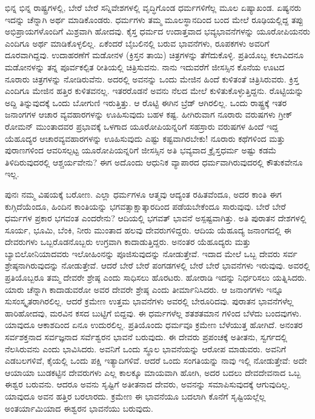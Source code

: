 ಭಿನ್ನ ಭಿನ್ನ ರಾಷ್ಟ್ರಗಳಲ್ಲಿ, ಬೇರೆ ಬೇರೆ ಸನ್ನಿವೇಶಗಳಲ್ಲಿ ವೃದ್ಧಿಗೊಂಡ ಧರ್ಮಗಳಿಗೆಲ್ಲ ಮೂಲ ಏಷ್ಯಾಖಂಡ. ಏಷ್ಯನರು ಇದನ್ನು ಚೆನ್ನಾಗಿ ಅರ್ಥ ಮಾಡಿಕೊಂಡರು. ಧರ್ಮಗಳು ತಮ್ಮ ಮೂಲಸ್ಥಾನದಿಂದ ಬಂದ ಮೇಲೆ ರೂಢಿಯಲ್ಲಿದ್ದ ತಪ್ಪು ಅಭಿಪ್ರಾಯಗಳೊಂದಿಗೆ ಮಿಶ್ರವಾಗಿ ಹೋದವು. ಕೈಸ್ತ ಧರ್ಮದ ಉದಾತ್ತವಾದ ಭವ್ಯಭಾವನೆಗಳನ್ನು ಯೂರೋಪಿಯನರು ಎಂದಿಗೂ ಅರ್ಥ ಮಾಡಿಕೊಳ್ಳಲಿಲ್ಲ. ಏಕೆಂದರೆ ಬೈಬಲಿನಲ್ಲಿ ಬರುವ ಭಾವನೆಗಳು, ರೂಪಕಗಳು ಅವರಿಗೆ ದೂರವಾಗಿದ್ದವು. ಉದಾಹರಣೆಗೆ ಮಡೋನಳ (ಕ್ರಿಸ್ತನ ತಾಯಿ) ಚಿತ್ರಗಳನ್ನು ತೆಗೆದುಕೊಳ್ಳಿ. ಪ್ರತಿಯೊಬ್ಬ ಕಲಾವಿದನೂ ಮಡೋನಳನ್ನು ತನ್ನ ಪೂರ್ವಕಲ್ಪಿತ ರೀತಿಯಲ್ಲಿ ಚಿತ್ರಿಸುವನು. ನಾನು ಇದುವರೆಗೆ ಜೀಸಸ್ಸಿನ ಕೊನೆಯ ಊಟದ ನೂರಾರು ಚಿತ್ರಗಳನ್ನು ನೋಡಿರುವೆನು. ಅದರಲ್ಲಿ ಅವನನ್ನು ಒಂದು ಮೇಜಿನ ಹಿಂದೆ ಕುಳಿತಂತೆ ಚಿತ್ರಿಸಿರುವರು. ಕ್ರಿಸ್ತ ಎಂದಿಗೂ ಮೇಜಿನ ಹತ್ತಿರ ಕುಳಿತವನಲ್ಲ. ಇತರರೊಡನೆ ಅವನು ನೆಲದ ಮೇಲೆ ಕುಳಿತುಕೊಳ್ಳುತ್ತಿದ್ದನು. ರೊಟ್ಟಿಯನ್ನು ಅದ್ದಿ ತಿನ್ನುವುದಕ್ಕೆ ಒಂದು ಬೋಗುಣಿ ಇರುತ್ತಿತ್ತು. ಆ ರೊಟ್ಟಿ ಈಗಿನ ಬ್ರೆಡ್ ಆಗಿರಲಿಲ್ಲ. ಒಂದು ರಾಷ್ಟ್ರಕ್ಕೆ ಇತರ ಜನಾಂಗಗಳ ಆಚಾರ ವ್ಯವಹಾರಗಳನ್ನು ಊಹಿಸುವುದು ಬಹಳ ಕಷ್ಟ. ಹೀಗಿರುವಾಗ ನೂರಾರು ವರುಷಗಳು ಗ್ರೀಕ್ ರೋಮನ್ ಮುಂತಾದವರ ಪ್ರಭಾವಕ್ಕೆ ಒಳಗಾದ ಯೂರೋಪಿಯನ್ನರಿಗೆ ಸಹಸ್ರಾರು ವರುಷಗಳ ಹಿಂದೆ ಇದ್ದ ಯೆಹೂದ್ಯರ ಆಚಾರವ್ಯವಹಾರಗಳನ್ನು ಊಹಿಸುವುದು ಎಷ್ಟು ಕಷ್ಟವಾಗಿರಬೇಕು! ನೂರಾರು ಕಥೆಗಳಿಂದ ಮತ್ತು ಪುರಾಣಗಳಿಂದ ಆವರಿಸಲ್ಪಟ್ಟ ಯೂರೋಪಿಯನ್ನರಿಗೆ ಜೀಸಸ್ಸಿನ ಅತಿ ಭವ್ಯವಾದ ಕ್ರೈಸ್ತಧರ್ಮ ಅಷ್ಟು ಕಡಮೆ ತಿಳಿದಿರುವುದರಲ್ಲಿ ಆಶ್ಚರ್ಯವೇನು? ಈಗ ಅದೊಂದು ಆಧುನಿಕ ವ್ಯಾಪಾರದ ಧರ್ಮವಾಗಿರುವುದರಲ್ಲಿ ಕೌತುಕವೇನೂ ಇಲ್ಲ.

ಪುನಃ ನಮ್ಮ ವಿಷಯಕ್ಕೆ ಬರೋಣ. ಎಲ್ಲಾ ಧರ್ಮಗಳೂ ಆತ್ಮವು ಆದ್ಯಂತ ರಹಿತವೆಂದೂ, ಅದರ ಕಾಂತಿ ಈಗ ಕುಗ್ಗಿದೆಯೆಂದೂ, ಹಿಂದಿನ ಕಾಂತಿಯನ್ನು ಭಗವತ್ಸಾಕ್ಷಾತ್ಕಾರದಿಂದ ಪಡೆಯಬೇಕೆಂದೂ ಸಾರುವುವು. ಬೇರೆ ಬೇರೆ ಧರ್ಮಗಳ ಪ್ರಕಾರ ಭಗವಂತ ಎಂದರೇನು? ಆದಿಯಲ್ಲಿ ಭಗವತ್ ಭಾವನೆ ಅಸ್ಪಷ್ಟವಾಗಿತ್ತು. ಅತಿ ಪುರಾತನ ದೇಶಗಳಲ್ಲಿ ಸೂರ್ಯ, ಭೂಮಿ, ಬೆಂಕಿ, ನೀರು ಮುಂತಾದ ಹಲವು ದೇವರುಗಳಿದ್ದರು. ಆದಿಯ ಯೆಹೂದ್ಯ ಜನಾಂಗದಲ್ಲಿ ಈ ದೇವರುಗಳು ಒಬ್ಬರೊಡನೊಬ್ಬರು ಉಗ್ರವಾಗಿ ಕಾದಾಡುತ್ತಿದ್ದರು. ಅನಂತರ ಯೆಹೂದ್ಯರು ಮತ್ತು ಬ್ಯಾಬಿಲೋನಿಯಾದವರು ಇಲೋಹಿಂನನ್ನು ಪೂಜಿಸುವುದನ್ನು ನೋಡುತ್ತೇವೆ. ಇದಾದ ಮೇಲೆ ಒಬ್ಬ ದೇವರು ಸರ್ವ ಶ್ರೇಷ್ಠನಾಗಿರುವುದನ್ನು ನೋಡುತ್ತೇವೆ. ಆದರೆ ಬೇರೆ ಬೇರೆ ಪಂಗಡಗಳಲ್ಲಿ ಬೇರೆ ಬೇರೆ ಭಾವನೆಗಳು ಇರುವುವು. ಅವರಲ್ಲಿ ಪ್ರತಿಯೊಬ್ಬರೂ ತಮ್ಮ ದೇವರೇ ಶ್ರೇಷ್ಠ ಎಂದು ಸಾಧಿಸಲು ಹೊರಟರು. ಹೋರಾಡಿ ಇದನ್ನು ನಿರ್ಧರಿಸಲು ಯತ್ನಿಸಿದರು. ಯಾರು ಚೆನ್ನಾಗಿ ಕಾದಾಡುವರೋ ಅವರ ದೇವರೇ ಶ್ರೇಷ್ಠ ಎಂದು ತೀರ್ಮಾನಿಸಿದರು. ಆ ಜನಾಂಗಗಳು ಇನ್ನೂ ಸುಸಂಸ್ಕೃತರಾಗಿರಲಿಲ್ಲ. ಆದರೆ ಕ್ರಮೇಣ ಉತ್ತಮ ಭಾವನೆಗಳು ಅವರಲ್ಲಿ ಬೇರೂರಿದವು. ಪುರಾತನ ಭಾವನೆಗಳೆಲ್ಲ ಹಾರಿಹೋದವು, ಮರವಿನ ಕಸದ ಬುಟ್ಟಿಗೆ ಬಿದ್ದವು. ಈ ಧರ್ಮಗಳೆಲ್ಲ ಶತಶತಮಾನ ಗಳಿಂದ ಬೆಳೆದು ಬಂದವುಗಳು. ಯಾವುದೂ ಆಕಾಶದಿಂದ ಏನೂ ಉದುರಲಿಲ್ಲ. ಪ್ರತಿಯೊಂದು ಧರ್ಮವೂ ಕ್ರಮೇಣ ಬೆಳೆಯುತ್ತ ಹೋಗಿದೆ. ಅನಂತರ ಸರ್ವಶಕ್ತನಾದ ಸರ್ವಜ್ಞನಾದ ಸರ್ವೆಶ್ವರನ ಭಾವನೆ ಬರುವುದು. ಈ ದೇವರು ಪ್ರಪಂಚಕ್ಕೆ ಅತೀತನು, ಸ್ವರ್ಗದಲ್ಲಿ ನೆಲಸಿರುವನು ಎಂದು ಭಾವಿಸಿದರು. ಅವನಿಗೆ ಒಂದು ಸ್ಥೂಲ ಭಾವನೆಯನ್ನು ಆರೋಪ ಮಾಡುವರು. ಅವನಿಗೆ ಎಡಬಲಗಳಿವೆ, ಕೈಯಲ್ಲಿ ಒಂದು ಪಕ್ಷಿ ಇತ್ಯಾದಿಗಳಿವೆ. ಆದರೆ ಒಂದು ಸಂಗತಿಯನ್ನು ನಾವು ಇಲ್ಲಿ ನೋಡುತ್ತೇವೆ: ಅದೇ ಆಯಾಯಾ ಬುಡಕಟ್ಟಿನ ದೇವರುಗಳು ಎಲ್ಲ ಕಾಲಕ್ಕೂ ಮಾಯವಾಗಿ ಹೋಗಿ, ಅದರ ಬದಲು ದೇವದೇವನಾದ ಒಬ್ಬ ಈಶ್ವರ ಬರುವನು. ಆದರೂ ಅವನು ಸೃಷ್ಟಿಗೆ ಅತೀತನಾದ ದೇವರು, ಅವನನ್ನು ಸಮಾಪಿಸುವುದಕ್ಕೆ ಆಗುವುದಿಲ್ಲ. ಯಾವುದೂ ಅವನ ಹತ್ತಿರ ಬರಲಾರದು. ಕ್ರಮೇಣ ಈ ಭಾವನೆಯೂ ಬದಲಾಗಿ ಕೊನೆಗೆ ಸೃಷ್ಟಿಯಲ್ಲೆಲ್ಲ ಅಂತರ್ಯಾಮಿಯಾದ ಈಶ್ವರನ ಭಾವನೆಯು ಬರುವುದು.

